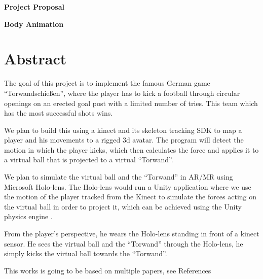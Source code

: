 \documentclass[a4paper,pagesize 10pt]{scrartcl}
\begin{document}
\begin{center}{\Huge\textbf{Project Proposal}}\end{center}
\begin{center}{\Large\textbf{Body Animation}}\end{center}

\section{Abstract}

%
%
%
%

\begin{flushleft}
The goal of this project is to implement the famous German game “Torwandschießen”, where the player has to kick a football through circular openings on an erected goal post with a limited number of tries. This team which has the most successful shots wins.
\end{flushleft}

\begin{flushleft}
We plan to build this using a kinect and its skeleton tracking SDK \cite{kinect_basic} to map a player and his movements to a rigged 3d avatar. The program will detect the motion in which the player kicks, which then calculates the force and applies it to a virtual ball that is projected to a virtual “Torwand”.
\end{flushleft}

\begin{flushleft}
We plan to simulate the virtual ball and the “Torwand” in AR/MR using Microsoft Holo-lens. The Holo-lens \cite{hololens} would run a Unity application where we use the motion of the player tracked from the Kinect to simulate the forces acting on the virtual ball in order to project it, which can be achieved using the Unity physics engine \cite{unity}.
\end{flushleft}

\begin{flushleft}
From the player’s perspective, he wears the Holo-lens standing in front of a kinect sensor. He sees the virtual ball and the “Torwand” through the Holo-lens, he simply kicks the virtual ball towards the “Torwand”.
\end{flushleft}

\begin{flushleft}
This works is going to be based on multiple papers, see References \cite{source1, source2, source3, source4} 
\end{flushleft}
\end{document}
